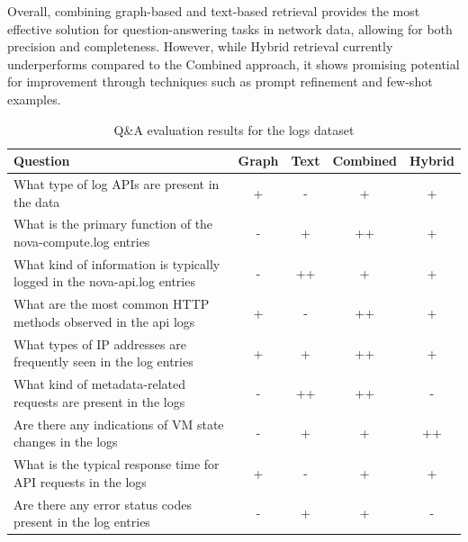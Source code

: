 \documentclass[conference]{IEEEtran}
\begin{document}
Overall, combining graph-based and text-based retrieval provides the most effective solution for question-answering tasks in network data, allowing for both precision and completeness. However, while Hybrid retrieval currently underperforms compared to the Combined approach, it shows promising potential for improvement through techniques such as prompt refinement and few-shot examples.

\begin{table}
\centering
\caption{Q\&A evaluation results for the logs dataset}
\begin{tabular}{|p{12cm}|c|c|c|c|}
\hline
\textbf{Question} & \textbf{Graph} & \textbf{Text} & \textbf{Combined} & \textbf{Hybrid} \\
\hline
What type of log APIs are present in the data & \cellcolor{green!30}+ & \cellcolor{red!30}- & \cellcolor{green!30}+ & \cellcolor{green!30}+ \\
\hline
What is the primary function of the nova-compute.log entries & \cellcolor{red!30}- & \cellcolor{green!30}+ & \cellcolor{orange!50}++ & \cellcolor{green!30}+ \\
\hline
What kind of information is typically logged in the nova-api.log entries & \cellcolor{red!30}- & \cellcolor{orange!50}++ & \cellcolor{green!30}+ & \cellcolor{green!30}+ \\
\hline
What are the most common HTTP methods observed in the api logs & \cellcolor{green!30}+ & \cellcolor{red!30}- & \cellcolor{orange!50}++ & \cellcolor{green!30}+ \\
\hline
What types of IP addresses are frequently seen in the log entries & \cellcolor{green!30}+ & \cellcolor{green!30}+ & \cellcolor{orange!50}++ & \cellcolor{green!30}+ \\
\hline
What kind of metadata-related requests are present in the logs & \cellcolor{red!30}- & \cellcolor{orange!50}++ & \cellcolor{orange!50}++ & \cellcolor{red!30}- \\
\hline
Are there any indications of VM state changes in the logs & \cellcolor{red!30}- & \cellcolor{green!30}+ & \cellcolor{green!30}+ & \cellcolor{orange!50}++ \\
\hline
What is the typical response time for API requests in the logs & \cellcolor{green!30}+ & \cellcolor{red!30}- & \cellcolor{green!30}+ & \cellcolor{green!30}+ \\
\hline
Are there any error status codes present in the log entries & \cellcolor{red!30}- & \cellcolor{green!30}+ & \cellcolor{green!30}+ & \cellcolor{red!30}- \\

\end{tabular}
\end{table}
\end{document}
